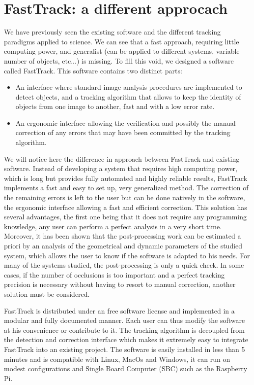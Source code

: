     \section{FastTrack: a different approcach}
    We have previously seen the existing software and the different tracking paradigms applied to science. We can see that a fast approach, requiring little computing power, and generalist (can be applied to different systems, variable number of objects, etc...) is missing.
    To fill this void, we designed a software called FastTrack. This software contains two distinct parts:
    \begin{itemize}
        \item An interface where standard image analysis procedures are implemented to detect objects, and a tracking algorithm that allows to keep the identity of objects from one image to another, fast and with a low error rate.
        \item An ergonomic interface allowing the verification and possibly the manual correction of any errors that may have been committed by the tracking algorithm.
    \end{itemize}
    We will notice here the difference in approach between FastTrack and existing software. Instead of developing a system that requires high computing power, which is long but provides fully automated and highly reliable results, FastTrack implements a fast and easy to set up, very generalized method. The correction of the remaining errors is left to the user but can be done natively in the software, the ergonomic interface allowing a fast and efficient correction.
    This solution has several advantages, the first one being that it does not require any programming knowledge, any user can perform a perfect analysis in a very short time. Moreover, it has been shown that the post-processing work can be estimated a priori by an analysis of the geometrical and dynamic parameters of the studied system, which allows the user to know if the software is adapted to his needs. For many of the systems studied, the post-processing is only a quick check. In some cases, if the number of occlusions is too important and a perfect tracking precision is necessary without having to resort to manual correction, another solution must be considered.

    FastTrack is distributed under an free software license and implemented in a modular and fully documented manner. Each user can thus modify the software at his convenience or contribute to it. The tracking algorithm is decoupled from the detection and correction interface which makes it extremely easy to integrate FastTrack into an existing project. The software is easily installed in less than 5 minutes and is compatible with Linux, MacOs and Windows, it can run on modest configurations and Single Board Computer (SBC) such as the Raspberry Pi.


